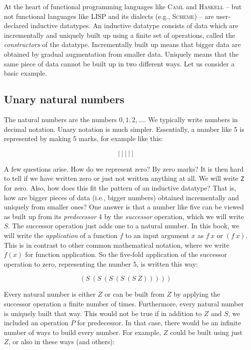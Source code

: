 \documentclass{book}[12pt]
\begin{document}
At the heart of functional programming languages like \textsc{Caml}
and \textsc{Haskell} -- but not functional languages like
\textsc{LISP} and its dialects (e.g., \textsc{Scheme}) -- are
user-declared inductive datatypes.  An inductive datatype consists of
data which are incrementally and uniquely built up using a finite set
of operations, called the \emph{constructors} of the datatype.
Incrementally built up means that bigger data are obtained by gradual
augmentation from smaller data.  Uniquely means that the same piece of
data cannot be built up in two different ways.  Let us consider a
basic example.

\subsection{Unary natural numbers}

The natural numbers are the numbers $0,1,2,\ldots$.  We typically
write numbers in decimal notation.  Unary notation is much simpler.
Essentially, a number like 5 is represented by making 5 marks, for
example like this:

\[ |\ |\ |\ |\ | \]

\noindent A few questions arise.  How do we represent zero?  By zero
marks?  It is then hard to tell if we have written zero or just not
written anything at all.  We will write \texttt{Z} for zero.  Also,
how does this fit the pattern of an inductive datatype?  That is, how
are bigger pieces of data (i.e., bigger numbers) obtained
incrementally and uniquely from smaller ones?  One answer is that a
number like five can be viewed as built up from its \emph{predecessor}
4 by the \emph{successor} operation, which we will write $S$.  The
successor operation just adds one to a natural number.  In this book,
we will write the \emph{application} of a function $f$ to an input
argument $x$ as $f\ x$ or $(f\ x)$.  This is in contrast to other
common mathematical notation, where we write $f(x)$ for function
application.  So the five-fold application of the successor operation
to zero, representing the number 5, is written this way:

\[ (S\ (S\ (S\ (S\ (S\ Z))))) \]

Every natural number is either $Z$ or can be built from $Z$ by
applying the successor operation a finite number of times.
Furthermore, every natural number is uniquely built that way.  This
would not be true if in addition to $Z$ and $S$, we included an
operation $P$ for predecessor.  In that case, there would be an
infinite number of ways to build every number.  For example, $Z$ could
be built using just $Z$, or also in these ways (and others):
\end{document}
